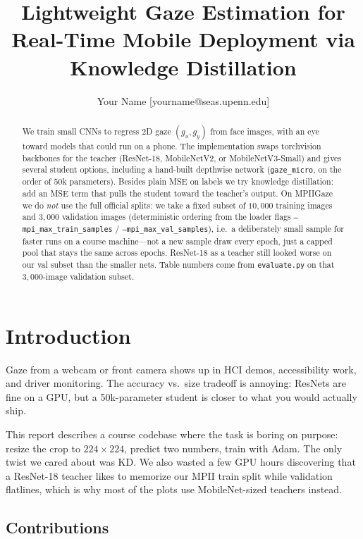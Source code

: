 \documentclass[10pt, reqno, letterpaper, twoside]{amsart}
\title{Lightweight Gaze Estimation for Real-Time Mobile Deployment via Knowledge Distillation}
\author{Your Name [yourname@seas.upenn.edu]}
\begin{document}
\begin{abstract}
We train small CNNs to regress 2D gaze $(g_x,g_y)$ from face images, with an eye toward models that could run on a phone. The implementation swaps torchvision backbones for the teacher (ResNet-18, MobileNetV2, or MobileNetV3-Small) and gives several student options, including a hand-built depthwise network (\texttt{gaze\_micro}, on the order of $50$k parameters). Besides plain MSE on labels we try knowledge distillation: add an MSE term that pulls the student toward the teacher's output. On MPIIGaze we do \emph{not} use the full official splits: we take a fixed subset of $10{,}000$ training images and $3{,}000$ validation images (deterministic ordering from the loader flags \texttt{--mpi\_max\_train\_samples} / \texttt{--mpi\_max\_val\_samples}), i.e.\ a deliberately small sample for faster runs on a course machine---not a new sample draw every epoch, just a capped pool that stays the same across epochs. ResNet-18 as a teacher still looked worse on our val subset than the smaller nets. Table numbers come from \texttt{evaluate.py} on that $3{,}000$-image validation subset.
\end{abstract}

\maketitle

\section{Introduction}

Gaze from a webcam or front camera shows up in HCI demos, accessibility work, and driver monitoring. The accuracy vs.\ size tradeoff is annoying: ResNets are fine on a GPU, but a 50k-parameter student is closer to what you would actually ship.

This report describes a course codebase where the task is boring on purpose: resize the crop to $224\times224$, predict two numbers, train with Adam. The only twist we cared about was KD. We also wasted a few GPU hours discovering that a ResNet-18 teacher likes to memorize our MPII train split while validation flatlines, which is why most of the plots use MobileNet-sized teachers instead.

\subsection{Contributions}
\end{document}
